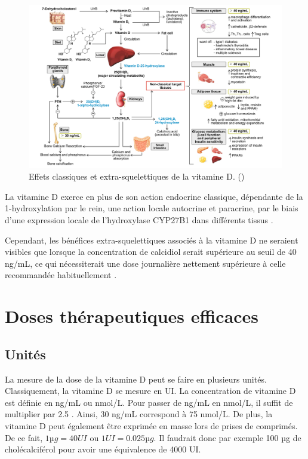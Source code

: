 \documentclass[
  a4paper,
  DIV=11,
  numbers=noendperiod,
  listof=totoc]{scrreprt}
\begin{document}
\begin{landscape}
\begin{figure}
\includegraphics{figures/extra-skeletal-effect.png} 
\caption[\textbf{Effets classiques et extra-squelettiques de la vitamine D.}]
{Effets classiques et extra-squelettiques de la vitamine D. (\cite{Caprio.2017})}
\label{fig:extra-skeletal}
\end{figure}
\end{landscape}

La vitamine D exerce en plus de son action endocrine classique,
dépendante de la 1-hydroxylation par le rein, une action locale
autocrine et paracrine, par le biais d'une expression locale de
l'hydroxylase \ac{CYP27B1} dans différents tissus
\autocite{Carmeliet.2015,Cannell.2008}.

Cependant, les bénéfices extra-squelettiques associés à la vitamine D ne
seraient visibles que lorsque la concentration de calcidiol serait
supérieure au seuil de 40 ng/mL, ce qui nécessiterait une dose
journalière nettement supérieure à celle recommandée habituellement
\autocite{Caprio.2017}.

\hypertarget{doses-thuxe9rapeutiques-efficaces}{%
\section{Doses thérapeutiques
efficaces}\label{doses-thuxe9rapeutiques-efficaces}}

\hypertarget{unituxe9s}{%
\subsection{Unités}\label{unituxe9s}}

La mesure de la dose de la vitamine D peut se faire en plusieurs unités.
Classiquement, la vitamine D se mesure en \ac{UI}. La concentration de
vitamine D est définie en ng/mL ou nmol/L. Pour passer de ng/mL en
nmol/L, il suffit de multiplier par 2.5 \autocite{Pramyothin.2012}.
Ainsi, 30 ng/mL correspond à 75 nmol/L. De plus, la vitamine D peut
également être exprimée en masse lors de prises de comprimés. De ce
fait, \(1 µg = 40 UI\) ou \(1 UI = 0.025 µg\). Il faudrait donc par
exemple 100 µg de cholécalciférol pour avoir une équivalence de 4000 UI.
\end{document}
